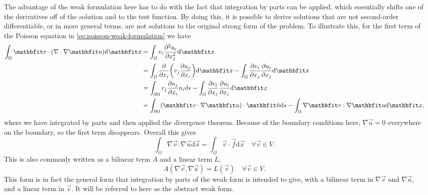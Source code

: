 The advantage of the weak formulation here has to do with the fact that integration by parts can be applied, which essentially shifts one of the derivatives off of the solution and to the test function.
By doing this, it is possible to derive solutions that are not second-order differentiable, or in more general terms, are not solutions to the original strong form of the problem.
To illustrate this, for the first term of the Poisson equation in \cref{eq:poisson-weak-formulation} we have
\begin{align}
    \int_{\Omega} \vec{v} \cdot (\nabla \cdot \nabla \vec{u}) \mathrm{d} \vec{x} &= \int_{\Omega} v_{i} \frac{\partial^{2} u_{i}}{\partial x_{j}^{2}} \mathrm{d} \vec{x} \nonumber\\
                                                                                                   &= \int_{\Omega} \frac{\partial}{\partial x_{i}} \mleft( v_{j} \frac{\partial u_{j}}{\partial x_{i}} \mright) \mathrm{d} \vec{x} - \int_{\Omega} \frac{\partial v_{i}}{\partial x_{j}} \frac{\partial u_{i}}{\partial x_{j}} \mathrm{d} \vec{x} \nonumber\\
                                                                                                   &= \int_{\partial \Omega} v_{j} \frac{\partial u_{j}}{\partial x_{i}} n_{i} \mathrm{d} s - \int_{\Omega} \frac{\partial v_{i}}{\partial x_{j}} \frac{\partial u_{i}}{\partial x_{j}} \mathrm{d} \vec{x} \nonumber\\
                                                                                                   &= \int_{\partial \Omega} (\vec{v} \cdot \nabla \vec{u}) \cdot \vec{\hat{n}} \mathrm{d} s - \int_{\Omega} \nabla \vec{v} : \nabla \vec{u} \mathrm{d} \vec{x},
\end{align}
where we have integrated by parts and then applied the divergence theorem.
Because of the boundary conditions here, $\nabla \vec{u} = 0$ everywhere on the boundary, so the first term disappears.
Overall this gives
\begin{equation}
    \int_{\Omega} \nabla \vec{v} : \nabla \vec{u} \mathrm{d} \vec{x} = \int_{\Omega} \vec{v} \cdot \vec{f} \mathrm{d} \vec{x} \quad \forall \vec{v} \in V.
\end{equation}
This is also commonly written as a bilinear term $A$ and a linear term $L$,
\begin{equation}
    A(\nabla \vec{v}, \nabla \vec{u}) = L(\vec{v}) \quad \forall \vec{v} \in V.
\end{equation}
This form is in fact the general form that integration by parts of the weak form is intended to give, with a bilinear term in $\nabla \vec{v}$ and $\nabla \vec{u}$, and a linear term in $\vec{v}$.
It will be referred to here as the abstract weak form.

